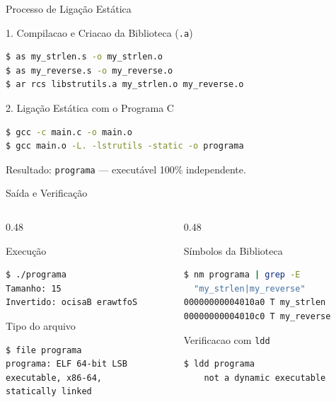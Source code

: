 \documentclass[aspectratio=169, 11pt]{beamer}
\begin{document}
\begin{frame}[fragile]{Processo de Ligação Estática}
  \begin{block}{1. Compilacao e Criacao da Biblioteca (\texttt{.a})}
    \begin{lstlisting}[language=bash]
$ as my_strlen.s -o my_strlen.o
$ as my_reverse.s -o my_reverse.o
$ ar rcs libstrutils.a my_strlen.o my_reverse.o
    \end{lstlisting}
  \end{block}

  \begin{block}{2. Ligação Estática com o Programa C}
    \begin{lstlisting}[language=bash]
$ gcc -c main.c -o main.o
$ gcc main.o -L. -lstrutils -static -o programa
    \end{lstlisting}
  \end{block}

  \vspace{0.2cm}
  \begin{center}
    Resultado: \texttt{programa} — executável \alert{100\% independente}.
  \end{center}
\end{frame}

\begin{frame}[fragile]{Saída e Verificação}
  \begin{columns}[T]
    \begin{column}{0.48\textwidth}
      \begin{block}{Execução}
        \begin{lstlisting}[language=bash]
$ ./programa
Tamanho: 15
Invertido: ocisaB erawtfoS
        \end{lstlisting}
      \end{block}
      \begin{block}{Tipo do arquivo}
        \begin{lstlisting}[language=bash]
$ file programa
programa: ELF 64-bit LSB
executable, x86-64,
statically linked
        \end{lstlisting}
      \end{block}
    \end{column}
    \begin{column}{0.48\textwidth}
      \begin{block}{Símbolos da Biblioteca}
        \begin{lstlisting}[language=bash]
$ nm programa | grep -E
  "my_strlen|my_reverse"
00000000004010a0 T my_strlen
00000000004010c0 T my_reverse
        \end{lstlisting}
      \end{block}
      \begin{block}{Verificacao com \texttt{ldd}}
        \begin{lstlisting}[language=bash]
$ ldd programa
    not a dynamic executable
        \end{lstlisting}
      \end{block}
    \end{column}
  \end{columns}
\end{frame}
\end{document}
